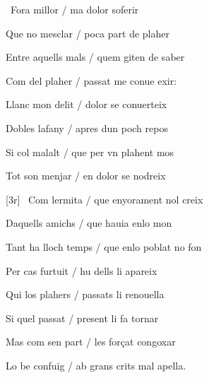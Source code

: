\begin{estrofa}

 \textparagraph\  Fora millor / ma dolor soferir

 Que no mesclar / poca part de plaher

 Entre aquells mals / quem giten de saber

 Com del plaher / passat me conue exir:

 Llanc mon delit / dolor se conuerteix

 Dobles lafany / apres dun poch repos

 Si col malalt / que per vn plahent mos

 Tot son menjar / en dolor se nodreix

\end{estrofa}



\begin{estrofa}

 [3r] \textparagraph\  Com lermita / que enyorament nol creix

 Daquells amichs / que hauia enlo mon

 Tant ha lloch temps / que enlo poblat no fon

 Per cas furtuit / hu dells li apareix

 Qui los plahers / passats li renouella

 Si quel passat / present li fa tornar

 Mas com sen part / les for\c{c}at congoxar

 Lo be confuig / ab grans crits mal apella.

\end{estrofa}



